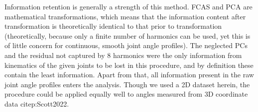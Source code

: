 \bigskip
Information retention is generally a strength of this method.
FCAS and PCA are mathematical transformations, which means that the information content after transformation is theoretically identical to that prior to transformation (theoretically, because only a finite number of harmonics can be used, yet this is of little concern for continuous, smooth joint angle profiles).
The neglected PCs and the residual not captured by 8 harmonics were the only information from kinematics of the given joints to be lost in this procedure, and by definition these contain the least information.
Apart from that, all information present in the raw joint angle profiles enters the analysis.
Though we used a 2D dataset herein, the procedure could be applied equally well to angles measured from 3D coordinate data citep:Scott2022.


